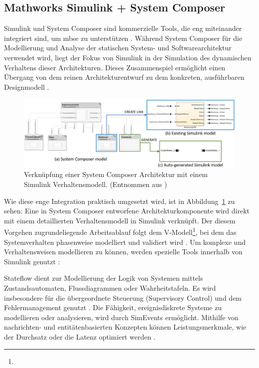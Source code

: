 \subsection{Mathworks Simulink + System Composer}
Simulink und System Composer sind kommerzielle Tools, die eng miteinander integriert sind, um \gls{mbse} zu unterstützen \cite{watkins2020system}.
Während System Composer für die Modellierung und  Analyse der statischen System- und Softwarearchitektur verwendet wird, liegt der Fokus von Simulink in der Simulation des dynamischen Verhaltens dieser Architekturen. Dieses Zusammenspiel ermöglicht einen Übergang von dem reinen Architekturentwurf zu dem konkreten, ausführbaren Designmodell \cite{chatterjee2020applications}.

\begin{figure}[h!]
  \centering
  \includegraphics[width=\textwidth]{figures/03StandDerTechnik/Simulink_System_Composer.png}
  \caption{Verknüpfung einer System Composer Architektur mit einem Simulink Verhaltensmodell. (Entnommen aus \cite{chatterjee2020applications})}
  \label{fig:simulink_system_composer}
\end{figure}

Wie diese enge Integration praktisch umgesetzt wird, ist in Abbildung~\ref{fig:simulink_system_composer} zu sehen: Eine in System Composer entworfene Architekturkomponente wird direkt mit einem detaillierten Verhaltensmodell in Simulink verknüpft. Der diesem Vorgehen zugrundeliegende Arbeitsablauf folgt dem V-Modell\footnote{}, bei dem das Systemverhalten phasenweise modelliert und validiert wird \cite{The24}. Um komplexe und Verhaltensweisen modellieren zu können, werden spezielle Tools innerhalb von Simulink genutzt \cite{chatterjee2020applications}:

Stateflow dient zur Modellierung der Logik von Systemen mittels Zustandsautomaten, Flussdiagrammen oder Wahrheitstafeln. Es wird insbesondere für die übergeordnete Steuerung (Supervisory Control) und dem Fehlermanagement genutzt \cite{chatterjee2020applications}. Die Fähigkeit, ereignisdiskrete Systeme zu modellieren oder analysieren, wird durch SimEvents ermöglicht. Mithilfe von nachrichten- und entitätenbasierten Konzepten können Leistungsmerkmale, wie der Durchsatz oder die Latenz optimiert werden \cite{chatterjee2020applications}.


